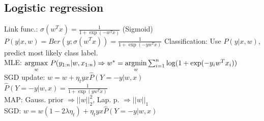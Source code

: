 \subsection*{Logistic regression}
Link func.: $\sigma(w^{T}x) = \frac{1}{1+\exp(-w^{T}x)}$ (Sigmoid)\\
$P(y|x,w) = Ber(y; \sigma(w^{T}x)) = \frac{1}{1+\exp(-y w^T x)}$
Classification: Use $P(y|x,w)$, predict most likely class label.\\
MLE: $\underset{w}{\operatorname{argmax}} ~ P(y_{1:n}|w,x_{1:n})\\
\Rightarrow w^* = \underset{w}{\operatorname{argmin}} \sum_{i=1}^n \log(1+\exp(-y_i w^T x_i))$\\
SGD update: $w = w + \eta_t y x \hat{P}(Y = -y|w,x)$\\
$\hat{P}(Y = -y|w,x) = \frac{1}{1+\exp(yw^{T}x)}$\\
MAP: Gauss. prior $\Rightarrow ||w||_2^2$, Lap. p. $\Rightarrow||w||_1$\\
SGD: $w = w (1-2\lambda \eta_t) + \eta_t y x \hat{P}(Y = -y|w,x)$